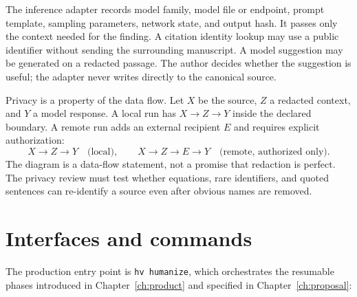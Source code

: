 The inference adapter records model family, model file or endpoint, prompt
template, sampling parameters, network state, and output hash. It passes only
the context needed for the finding. A citation identity lookup may use a public
identifier without sending the surrounding manuscript. A model suggestion may
be generated on a redacted passage. The author decides whether the suggestion
is useful; the adapter never writes directly to the canonical source.

Privacy is a property of the data flow. Let $X$ be the source, $Z$ a redacted
context, and $Y$ a model response. A local run has $X\to Z\to Y$ inside the
declared boundary. A remote run adds an external recipient $E$ and requires
explicit authorization:
\begin{equation}
  X\to Z\to Y\quad\text{(local)},\qquad
  X\to Z\to E\to Y\quad\text{(remote, authorized only)}.
  \label{eq:architecture-trust-flow}
\end{equation}
The diagram is a data-flow statement, not a promise that redaction is perfect.
The privacy review must test whether equations, rare identifiers, and quoted
sentences can re-identify a source even after obvious names are removed.

\section{Interfaces and commands}
\label{sec:architecture-interfaces}

The production entry point is \texttt{hv humanize}, which orchestrates the
resumable phases introduced in Chapter~\ref{ch:product} and specified in
Chapter~\ref{ch:proposal}:

